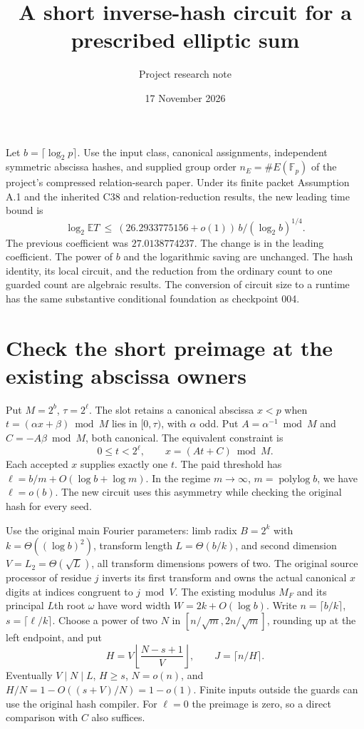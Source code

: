 \documentclass[11pt]{article}
\title{A short inverse-hash circuit for a prescribed elliptic sum}
\author{Project research note}
\date{17 November 2026}
\newcommand{\polylog}{\operatorname{polylog}}
\begin{document}
\maketitle

Let $b=\lceil\log_2p\rceil$. Use the input class, canonical assignments,
independent symmetric abscissa hashes, and supplied group order
$n_E=\#E(\mathbb F_p)$ of the project's compressed relation-search
paper. Under its finite packet Assumption A.1 and the inherited C38
and relation-reduction results, the new leading time bound is
\[
 \log_2\mathbb E T\ \le\
 (26.2933775156+o(1))\,b/(\log_2 b)^{1/4}.
\]
The previous coefficient was $27.0138774237$. The change is in the
leading coefficient. The power of $b$ and the logarithmic saving are
unchanged. The hash identity, its local circuit, and the reduction
from the ordinary count to one guarded count are algebraic results.
The conversion of circuit size to a runtime has the same substantive
conditional foundation as checkpoint 004.

\section{Check the short preimage at the existing abscissa owners}
Put $M=2^b$, $\tau=2^\ell$. The slot retains a canonical abscissa $x<p$
when $t=(\alpha x+\beta)\bmod M$ lies in $[0,\tau)$, with $\alpha$ odd.
Put $A=\alpha^{-1}\bmod M$ and $C=-A\beta\bmod M$, both canonical.
The equivalent constraint is
\[
     0\le t<2^\ell,\qquad x=(At+C)\bmod M .
\]
Each accepted $x$ supplies exactly one $t$. The paid threshold has
$\ell=b/m+O(\log b+\log m)$. In the regime $m\to\infty$,
$m=\polylog b$, we have $\ell=o(b)$. The new circuit uses this
asymmetry while checking the original hash for every seed.

Use the original main Fourier parameters: limb radix $B=2^k$ with
$k=\Theta((\log b)^2)$, transform length $L=\Theta(b/k)$, and second
dimension $V=L_2=\Theta(\sqrt L)$, all transform dimensions powers of
two. The original source processor of residue $j$ inverts its first
transform and owns the actual canonical $x$ digits at indices
congruent to $j\bmod V$. The existing modulus $M_F$ and its principal
$L$th root $\omega$ have word width $W=2k+O(\log b)$.
Write $n=\lceil b/k\rceil$, $s=\lceil\ell/k\rceil$.
Choose a power of two $N$ in $[n/\sqrt m,2n/\sqrt m]$, rounding up
at the left endpoint, and put
\[
 H=V\left\lfloor\frac{N-s+1}{V}\right\rfloor,\qquad J=\lceil n/H\rceil .
\]
Eventually $V\mid N\mid L$, $H\ge s$, $N=o(n)$, and
$H/N=1-O((s+V)/N)=1-o(1)$. Finite inputs outside the guards can use
the original hash compiler. For $\ell=0$ the preimage is zero, so a
direct comparison with $C$ also suffices.
\end{document}

